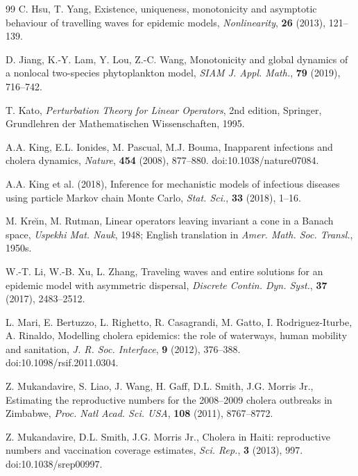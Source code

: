 \documentclass[a4paper,11pt]{amsart}
\theoremstyle{definition}
\numberwithin{equation}{section}
\theoremstyle{definition}
\begin{document}
\begin{thebibliography}{99}
C. Hsu, T. Yang,
Existence, uniqueness, monotonicity and asymptotic behaviour of travelling waves for epidemic models,
\textit{Nonlinearity}, \textbf{26} (2013), 121--139.

D. Jiang, K.-Y. Lam, Y. Lou, Z.-C. Wang,
Monotonicity and global dynamics of a nonlocal two-species phytoplankton model,
\textit{SIAM J. Appl. Math.}, \textbf{79} (2019), 716--742.

T. Kato,
\textit{Perturbation Theory for Linear Operators}, 2nd edition,
Springer, Grundlehren der Mathematischen Wissenschaften, 1995.

A.A. King, E.L. Ionides, M. Pascual, M.J. Bouma,
Inapparent infections and cholera dynamics,
\textit{Nature}, \textbf{454} (2008), 877--880.
doi:10.1038/nature07084.



A.A. King et al. (2018),
Inference for mechanistic models of infectious diseases using particle Markov chain Monte Carlo,
\textit{Stat. Sci.}, \textbf{33} (2018), 1--16.

M. Kre\u{\i}n, M. Rutman,
Linear operators leaving invariant a cone in a Banach space,
\textit{Uspekhi Mat. Nauk}, 1948; English translation in \textit{Amer. Math. Soc. Transl.}, 1950s.





W.-T. Li, W.-B. Xu, L. Zhang,
Traveling waves and entire solutions for an epidemic model with asymmetric dispersal,
\textit{Discrete Contin. Dyn. Syst.}, \textbf{37} (2017), 2483--2512.




L. Mari, E. Bertuzzo, L. Righetto, R. Casagrandi, M. Gatto, I. Rodriguez-Iturbe, A. Rinaldo,
Modelling cholera epidemics: the role of waterways, human mobility and sanitation,
\textit{J. R. Soc. Interface}, \textbf{9} (2012), 376--388.
doi:10.1098/rsif.2011.0304.


Z. Mukandavire, S. Liao, J. Wang, H. Gaff, D.L. Smith, J.G. Morris Jr.,
Estimating the reproductive numbers for the 2008--2009 cholera outbreaks in Zimbabwe,
\textit{Proc. Natl Acad. Sci. USA}, \textbf{108} (2011), 8767--8772.





Z. Mukandavire, D.L. Smith, J.G. Morris Jr.,
Cholera in Haiti: reproductive numbers and vaccination coverage estimates,
\textit{Sci. Rep.}, \textbf{3} (2013), 997.
doi:10.1038/srep00997.





\end{thebibliography}
\end{document}
